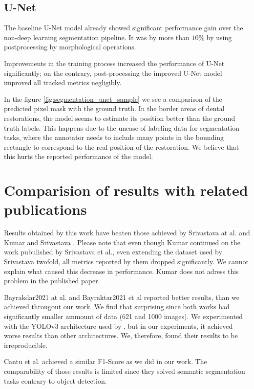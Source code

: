 \subsection{U-Net}
The baseline U-Net model already showed significant performance gain over the non-deep learning segmentation pipeline. It was by more than $10\%$ by using postprocessing by morphological operations.

Improvements in the training process increased the performance of U-Net significantly; on the contrary, post-processing the improved U-Net model improved all tracked metrics negligibly.

In the figure \ref{fig:segmentation_unet_sample} we see a comparison of the predicted pixel mask with the ground truth. In the border areas of dental restorations, the model seems to estimate its position better than the ground truth labels. This happens due to the unease of labeling data for segmentation tasks, where the annotator needs to include many points in the bounding rectangle to correspond to the real position of the restoration. We believe that this hurts the reported performance of the model.



\section{Comparision of results with related publications}

Results obtained by this work have beaten those achieved by Srivastava at al. \cite{Srivastava2017} and Kumar and Srivastava \cite{Kumar}. Please note that even though Kumar continued on the work pubulished by Srivastava et al., even extending the dataset used by Srivastava twofold, all metrics reported by them dropped significantly. We cannot explain what caused this decrease in performance. Kumar does not adress this problem in the published paper.

Bayrakdar2021 at al. \cite{Bayrakdar2021} and Bayraktar2021 et al \cite{Bayraktar2021} reported better results, than we achieved througout our work. We find that surprising since both works had significantly smaller ammount of data (621 and 1000 images). We experimented with the YOLOv3 architecture used by \cite{Bayraktar2021}, but in our experiments, it achieved worse results than other architectures. We, therefore, found their results to be irreproducible.

Cantu et al. achieved a similar F1-Score as we did in our work. The comparability of those results is limited since they solved semantic segmentation tasks contrary to object detection.
